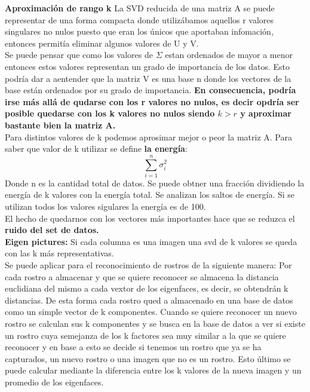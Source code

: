 \documentclass[titlepage,a4paper]{article}
\begin{document}
\textbf{Aproximación de rango k}
La SVD reducida de una matriz A se puede representar de una forma compacta donde utilizábamos aquellos r valores singulares no nulos puesto que eran los únicos que aportaban infomación, entonces permitía eliminar algunos valores de U y V. \\

Se puede pensar que como los valores de $\Sigma$ estan ordenados de mayor a menor entonces estos valores representan un grado de importancia de los datos. Esto podría dar a aentender que la matriz V es una base n donde los vectores de la base están ordenados por su grado de importancia. \textbf{En consecuencia, podría irse más allá de qudarse con los r valores no nulos, es decir opdría ser posible quedarse con los k valores no nulos siendo $k>r$ y aproximar bastante bien la matriz A. }\\

Para distintos valores de k podemos aprosimar mejor o peor la matriz A. Para saber que valor de k utilizar se define \textbf{la energía}: $$\sum_{i=1}^{n} \sigma_i^2$$
Donde n es la cantidad total de datos. Se puede obtner una fracción dividiendo la energía de k valores con la energía total. Se analizan los saltos de energía.  Si se utilizan todos los valores sigulares la energía es de 100. \\

El hecho de quedarnos con los vectores más importantes hace que se reduzca el \textbf{ruido del set de datos. } \\

\textbf{Eigen pictures:} Si cada columna es una imagen una svd de k valores se queda con las k más representativas. \\

Se puede aplicar para el reconocimiento de rostros de la siguiente manera: Por cada rostro a almacenar y que se quiere reconocer se almacena la distancia euclidiana del mismo a cada vextor de los eigenfaces, es decir, se obtendrán k distancias. De esta forma cada rostro qued a almacenado en una base de datos como un simple vector de k componentes. Cuando se quiere reconocer un nuevo rostro se calculan sus k componentes y se busca en la base de datos a ver si existe un rostro cuya semejanza de los k factores sea muy similar a la que se quiere reconocer y en base a esto se decide si tenemos un rostro que ya se ha capturados, un nuevo rostro o una imagen que no es un rostro. Esto último se puede calcular mediante la diferencia entre los k valores de la nueva imagen y un promedio de los eigenfaces. \\
\end{document}

